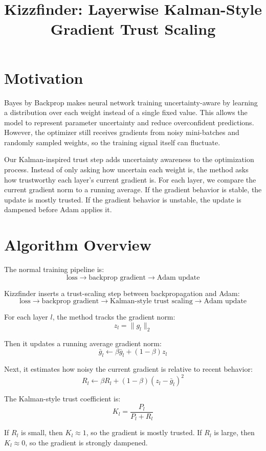 \documentclass{article}
\title{Kizzfinder: Layerwise Kalman-Style Gradient Trust Scaling}
\author{}
\date{}
\begin{document}
\maketitle

\section{Motivation}

Bayes by Backprop makes neural network training uncertainty-aware by learning a distribution over each weight instead of a single fixed value. This allows the model to represent parameter uncertainty and reduce overconfident predictions. However, the optimizer still receives gradients from noisy mini-batches and randomly sampled weights, so the training signal itself can fluctuate.

Our Kalman-inspired trust step adds uncertainty awareness to the optimization process. Instead of only asking how uncertain each weight is, the method asks how trustworthy each layer's current gradient is. For each layer, we compare the current gradient norm to a running average. If the gradient behavior is stable, the update is mostly trusted. If the gradient behavior is unstable, the update is dampened before Adam applies it.

\section{Algorithm Overview}

The normal training pipeline is:
\[
\text{loss} \rightarrow \text{backprop gradient} \rightarrow \text{Adam update}
\]

Kizzfinder inserts a trust-scaling step between backpropagation and Adam:
\[
\text{loss} \rightarrow \text{backprop gradient} \rightarrow \text{Kalman-style trust scaling} \rightarrow \text{Adam update}
\]

For each layer $l$, the method tracks the gradient norm:
\[
z_l = \|g_l\|_2
\]

Then it updates a running average gradient norm:
\[
\bar{g}_l \leftarrow \beta \bar{g}_l + (1-\beta)z_l
\]

Next, it estimates how noisy the current gradient is relative to recent behavior:
\[
R_l \leftarrow \beta R_l + (1-\beta)(z_l-\bar{g}_l)^2
\]

The Kalman-style trust coefficient is:
\[
K_l = \frac{P_l}{P_l + R_l}
\]

If $R_l$ is small, then $K_l \approx 1$, so the gradient is mostly trusted. If $R_l$ is large, then $K_l \approx 0$, so the gradient is strongly dampened.
\end{document}
